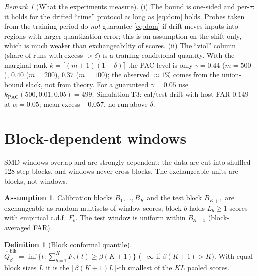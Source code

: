 \documentclass[conference]{IEEEtran}
\theoremstyle{definition}
\newtheorem{assumption}{Assumption}
\newtheorem{definition}{Definition}
\theoremstyle{remark}
\newtheorem{remark}{Remark}
\newcommand{\Q}{\widehat Q}
\begin{document}
\begin{remark}[What the experiments measure]
(i) The bound is one-sided and per-$\tau$: it holds for the drifted ``time'' protocol as long as \eqref{eq:dom} holds. Probes taken from the training period do \emph{not} guarantee \eqref{eq:dom} if drift moves inputs into regions with larger quantization error; this is an assumption on the shift only, which is much weaker than exchangeability of scores. (ii) The ``viol'' column (share of runs with excess $>\delta$) is a training-conditional quantity. With the marginal rank $k=\lceil(m+1)(1-\delta)\rceil$ the PAC level is only $\gamma=0.44$ ($m=500$), $0.40$ ($m=200$), $0.37$ ($m=100$); the observed $\approx1\%$ comes from the union-bound slack, not from theory. For a guaranteed $\gamma=0.05$ use $k_{\mathrm{PAC}}(500,0.01,0.05)=499$. Simulation T3: cal/test drift with host FAR $0.149$ at $\alpha=0.05$; mean excess $-0.057$, no run above $\delta$.
\end{remark}

\section{Block-dependent windows}\label{sec:block}
SMD windows overlap and are strongly dependent; the data are cut into shuffled 128-step blocks, and windows never cross blocks. The exchangeable units are blocks, not windows.

\begin{assumption}\label{ass:block}
Calibration blocks $B_1,\dots,B_K$ and the test block $B_{K+1}$ are exchangeable as random multisets of window scores; block $b$ holds $L_b\ge1$ scores with empirical c.d.f.\ $F_b$. The test window is uniform within $B_{K+1}$ (block-averaged FAR).
\end{assumption}

\begin{definition}[Block conformal quantile]
$\Q^{\mathrm{blk}}_\beta=\inf\{t:\sum_{b=1}^K F_b(t)\ge\beta(K+1)\}$ ($+\infty$ if $\beta(K+1)>K$). With equal block sizes $L$ it is the $\lceil\beta(K+1)L\rceil$-th smallest of the $KL$ pooled scores.
\end{definition}
\end{document}
